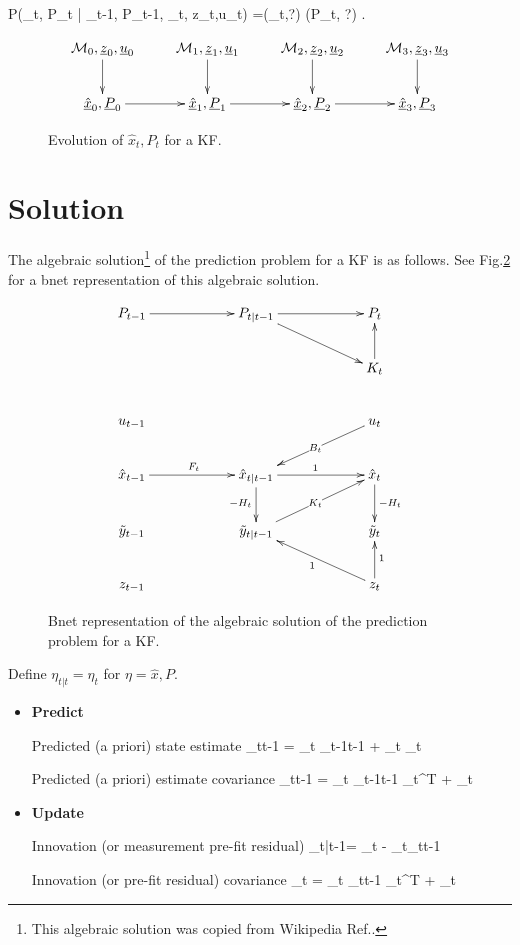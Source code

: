\beq \color{blue}
P(_t, P_t | 
_{t-1}, P_{t-1},
\calm_t,
z_t,u_t)
=\delta(_t,?)
\delta(P_t, ?)
\;.
\eeq

\begin{figure}[h!]
\centering
$$\xymatrix{
\calm_0, \rvz_0,\rvu_0\ar[d]&
\calm_1, \rvz_1,\rvu_1\ar[d]&
\calm_2, \rvz_2,\rvu_2\ar[d]&
\calm_3, \rvz_3,\rvu_3\ar[d]
\\
\ul{\hat{x}}_0, 
\ul{P}_0\ar[r]&
\ul{\hat{x}}_1, 
\ul{P}_1\ar[r]&
\ul{\hat{x}}_2, 
\ul{P}_2\ar[r]&
\ul{\hat{x}}_3, 
\ul{P}_3
}$$
\caption{Evolution of
$\hat{x}_t, P_t$ for a KF.}
\label{fig-kal-evol}
\end{figure}

\section{
Solution} 

The algebraic solution\footnote{This
algebraic
 solution was copied from 
Wikipedia Ref.\cite{wiki-kalman}.}
of
the prediction problem
for a KF 
is as follows.
See Fig.\ref{fig-kal-evol-plus}
for a bnet representation
of this algebraic
solution.

\begin{figure}[h!]
$$
\xymatrix@C=5pc{
P_{t-1}\ar[r]
&P_{t|t-1}\ar[r]\ar[rd]
&P_t
\\
&&
K_t\ar[u]
\\
u_{t-1}
&
&u_t\ar[ld]|{B_t}
\\
\hatx_{t-1}\ar[r]^{F_t}
&\hatx_{t|t-1}\ar[r]^1
\ar[d]_{-H_t}
&\hatx_t\ar[d]^{-H_t}
\\
\tilde{y}_{t-1}
&\tilde{y}_{t|t-1}\ar[ru]|{K_t}
&\tilde{y}_t
\\
z_{t-1}
&
&z_t\ar[lu]^1
\ar[u]_1
}
$$
\caption{Bnet representation
of the algebraic
solution of
the prediction 
problem for a KF.}
\label{fig-kal-evol-plus}
\end{figure}


Define $\eta_{t|t}=\eta_t$ for 
$\eta=\hat{x}, P$.

\begin{itemize}
\item{\bf Predict}

Predicted (a priori) state estimate
\beq
{}_{t\mid t-1} =
 _t
_{t-1\mid t-1}
 + _t _{t}
\eeq

Predicted (a priori) estimate covariance
\beq
{}_{t\mid t-1} =
 _t 
_{t-1\mid t-1}
 _t^\textsf{T} +
 _t
\eeq

\item{\bf Update}

Innovation (or measurement 
pre-fit residual)
\beq
{}_{t|t-1}= 
_t - 
_t_{t\mid t-1}
\eeq

Innovation (or pre-fit residual)
 covariance
\beq
{}_t = _t 
_{t\mid t-1} 
_t^\textsf{T} +
 _t
\eeq

\end{itemize}


